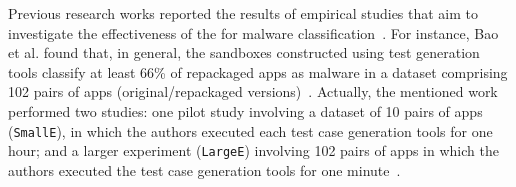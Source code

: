 







Previous research works reported the results of empirical studies that aim to investigate the effectiveness of
the \mas for malware classification~\cite{DBLP:conf/wcre/BaoLL18,DBLP:conf/scam/CostaMCMVBC20}.
For instance, Bao et al. found that, in general, the sandboxes constructed using test generation tools classify at least 66\% of repackaged apps as malware in a
dataset comprising 102 pairs of apps (original/repackaged versions)~\cite{DBLP:conf/wcre/BaoLL18}.
Actually, the mentioned work performed two studies: one pilot study involving a dataset
of 10 pairs of apps (\texttt{SmallE}), in which the authors executed each test case generation tools for one hour; and a larger experiment
(\texttt{LargeE}) involving 102 pairs of
apps in which the authors executed the test case generation tools for one minute~\cite{DBLP:conf/wcre/BaoLL18}.

